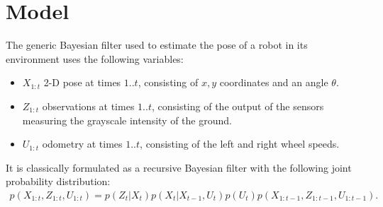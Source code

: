 \documentclass{svmult}
\begin{document}
\section{Model}



The generic Bayesian filter used to estimate the pose of a robot in its environment uses the following variables:
\begin{itemize}
\item $X_{1:t}$ 2-D pose at times $1..t$, consisting of $x,y$ coordinates and an angle $\theta$.
\item $Z_{1:t}$ observations at times $1..t$, consisting of the output of the sensors measuring the grayscale intensity of the ground.
\item $U_{1:t}$ odometry at times $1..t$, consisting of the left and right wheel speeds.
\end{itemize}

It is classically formulated as a recursive Bayesian filter with the following joint probability distribution:
\begin{equation}
\begin{split}
p(X_{1:t}, Z_{1:t}, U_{1:t}) = p(Z_t|X_t) p(X_t|X_{t-1}, U_{t}) p(U_t) p(X_{1:t-1}, Z_{1:t-1}, U_{1:t-1}).
\end{split}
\end{equation}
\end{document}
